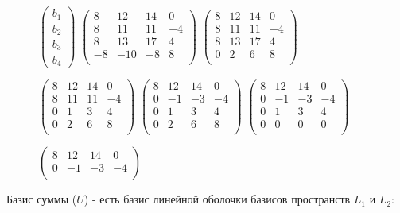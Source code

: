 \documentclass[10pt]{article}
\begin{document}
\begin{figure}[H] 
	$\begin{pmatrix}
	b_1 \\
	b_2 \\
	b_3 \\
	b_4
	\end{pmatrix}$
	\text{ = }
	$\begin{pmatrix}
	8 & 12 & 14 & 0 \\
	8 & 11 & 11 & -4 \\
	8 & 13 & 17 & 4 \\
	-8 & -10 & -8 & 8 \\
	\end{pmatrix}$
	\text{ = }
	$\begin{pmatrix}
	8 & 12 & 14 & 0 \\
	8 & 11 & 11 & -4 \\
	8 & 13 & 17 & 4 \\
	0 & 2 & 6 & 8 \\
	\end{pmatrix}$
	\text{ = }
	
	\text{ = }
	$\begin{pmatrix}
	8 & 12 & 14 & 0 \\
	8 & 11 & 11 & -4 \\
	0 & 1 & 3 & 4 \\
	0 & 2 & 6 & 8 \\
	\end{pmatrix}$
	\text{ = }
	$\begin{pmatrix}
	8 & 12 & 14 & 0 \\
	0 & -1 & -3 & -4 \\
	0 & 1 & 3 & 4 \\
	0 & 2 & 6 & 8 \\
	\end{pmatrix}$
	\text{ = }
	$\begin{pmatrix}
	8 & 12 & 14 & 0 \\
	0 & -1 & -3 & -4 \\
	0 & 1 & 3 & 4 \\
	0 & 0 & 0 & 0 \\
	\end{pmatrix}$
	\text{ = }
	
	\text{ = }
	$\begin{pmatrix}
	8 & 12 & 14 & 0 \\
	0 & -1 & -3 & -4 \\ 
	\end{pmatrix}$
\end{figure}
Базис суммы  ($U$) - есть базис линейной оболочки базисов пространств $L_1$ и $L_2$:
\end{document}
